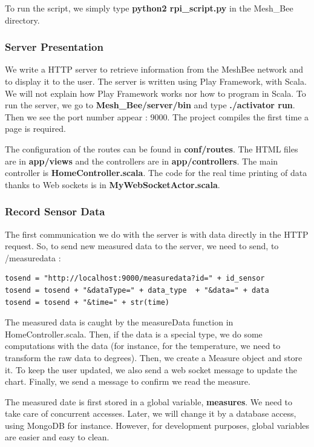 To run the script, we simply type \textbf{python2 rpi\_script.py} in the Mesh\_Bee directory.

\subsubsection{Server Presentation}

We write a HTTP server to retrieve information from the MeshBee network and to display it to the user. The server is written using Play Framework, with Scala. We will not explain how Play Framework works nor how to program in Scala. To run the server, we go to \textbf{Mesh\_Bee/server/bin} and type \textbf{./activator run}. Then we see the port number appear : 9000. The project compiles the first time a page is required.

The configuration of the routes can be found in \textbf{conf/routes}. The HTML files are in \textbf{app/views} and the controllers are in \textbf{app/controllers}. The main controller is \textbf{HomeController.scala}. The code for the real time printing of data thanks to Web sockets is in \textbf{MyWebSocketActor.scala}.

\subsubsection{Record Sensor Data}

The first communication we do with the server is with data directly in the HTTP request. So, to send new measured data to the server, we need to send, to /measuredata :

\begin{lstlisting}[frame=single]
tosend = "http://localhost:9000/measuredata?id=" + id_sensor
tosend = tosend + "&dataType=" + data_type  + "&data=" + data
tosend = tosend + "&time=" + str(time)
\end{lstlisting}
   
The measured data is caught by the measureData function in HomeController.scala. Then, if the data is a special type, we do some computations with the data (for instance, for the temperature, we need to transform the raw data to degrees). Then, we create a Measure object and store it. To keep the user updated, we also send a web socket message to update the chart. Finally, we send a message to confirm we read the measure.

The measured date is first stored in a global variable, \textbf{measures}. We need to take care of concurrent accesses. Later, we will change it by a database access, using MongoDB for instance. However, for development purposes, global variables are easier and easy to clean.

